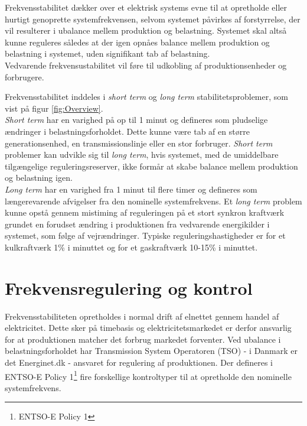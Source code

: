 
\label{Frekvensstabilitet}

Frekvensstabilitet dækker over et elektrisk systems evne til at opretholde eller hurtigt genoprette systemfrekvensen, selvom systemet påvirkes af forstyrrelse, der vil resulterer i ubalance mellem produktion og belastning. Systemet skal altså kunne reguleres således at der igen opnåes balance mellem produktion og belastning i systemet, uden signifikant tab af belastning.\\
Vedvarende frekvensustabilitet vil føre til udkobling af produktionsenheder og forbrugere.

Frekvensstabilitet inddeles i \textit{short term} og \textit{long term} stabilitetsproblemer, som vist på figur \ref{fig:Overview}.\\
\textit{Short term} har en varighed på op til 1 minut og defineres som pludselige ændringer i belastningsforholdet. Dette kunne være tab af en større generationsenhed, en transmissionslinje eller en stor forbruger. \textit{Short term} problemer kan udvikle sig til \textit{long term}, hvis systemet, med de umiddelbare tilgængelige reguleringsreserver, ikke formår at skabe balance mellem produktion og belastning igen.\\
\textit{Long term} har en varighed fra 1 minut til flere timer og defineres som længerevarende afvigelser fra den nominelle systemfrekvens. Et \textit{long term} problem kunne opstå gennem mistiming af reguleringen på et stort synkron kraftværk grundet en forudset ændring i produktionen fra vedvarende energikilder i systemet, som følge af vejrændringer.
Typiske reguleringshastigheder er for et kulkraftværk 1\% i minuttet og for et gaskraftværk 10-15\% i minuttet.

\section{Frekvensregulering og kontrol}
Frekvensstabiliteten opretholdes i normal drift af elnettet gennem handel af elektricitet. Dette sker på timebasis og elektricitetsmarkedet er derfor ansvarlig for at produktionen matcher det forbrug markedet forventer. Ved ubalance i belastningsforholdet har Transmission System Operatoren (TSO) - i Danmark er det Energinet.dk - ansvaret for regulering af produktionen. Der defineres i ENTSO-E Policy 1\footnote{ENTSO-E Policy 1} fire forskellige kontroltyper til at opretholde den nominelle systemfrekvens.

